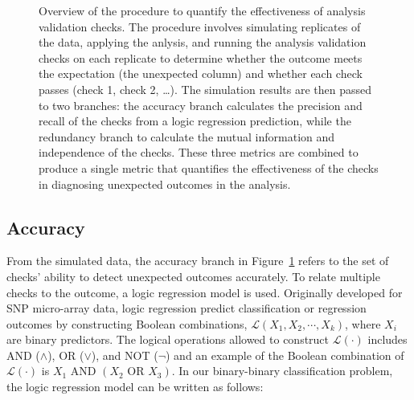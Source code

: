 \documentclass[
  12pt,
]{interact}
\begin{document}
\begin{figure}


\caption{\label{fig-metric-calc}Overview of the procedure to quantify
the effectiveness of analysis validation checks. The procedure involves
simulating replicates of the data, applying the anlysis, and running the
analysis validation checks on each replicate to determine whether the
outcome meets the expectation (the unexpected column) and whether each
check passes (check 1, check 2, \ldots). The simulation results are then
passed to two branches: the accuracy branch calculates the precision and
recall of the checks from a logic regression prediction, while the
redundancy branch to calculate the mutual information and independence
of the checks. These three metrics are combined to produce a single
metric that quantifies the effectiveness of the checks in diagnosing
unexpected outcomes in the analysis.}

\end{figure}%

\subsection{Accuracy}\label{accuracy}

From the simulated data, the accuracy branch in
Figure~\ref{fig-metric-calc} refers to the set of checks' ability to
detect unexpected outcomes accurately. To relate multiple checks to the
outcome, a logic regression model \citep{ruczinski_logic_2003} is used.
Originally developed for SNP micro-array data, logic regression predict
classification or regression outcomes by constructing Boolean
combinations, \(\mathcal{L}(X_1, X_2, \cdots, X_k)\), where \(X_i\) are
binary predictors. The logical operations allowed to construct
\(\mathcal{L(\cdot)}\) includes AND (\(\land\)), OR (\(\lor\)), and NOT
(\(\neg\)) and an example of the Boolean combination of
\(\mathcal{L(\cdot)}\) is \(X_1 \text{ AND } (X_2 \text{ OR } X_3)\). In
our binary-binary classification problem, the logic regression model can
be written as follows:
\end{document}
